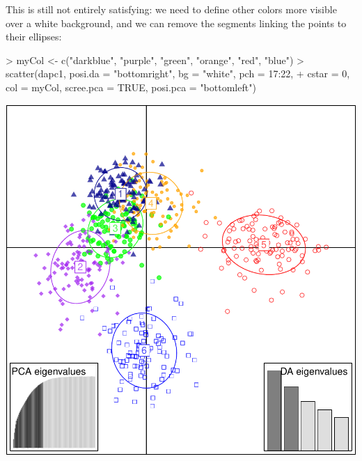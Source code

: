 \documentclass{article}
\begin{document}
\noindent This is still not entirely satisfying: we need to define other colors more visible over a white
background, and we can remove the segments linking the points to their ellipses:
\begin{Schunk}
\begin{Sinput}
> myCol <- c("darkblue", "purple", "green", "orange", "red", "blue")
> scatter(dapc1, posi.da = "bottomright", bg = "white", pch = 17:22, 
+     cstar = 0, col = myCol, scree.pca = TRUE, posi.pca = "bottomleft")
\end{Sinput}
\end{Schunk}
\includegraphics{figs/dapc-012}
\end{document}
